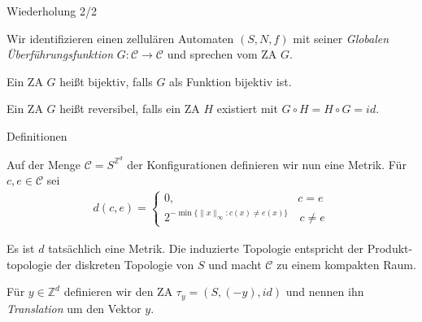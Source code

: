 \documentclass[aspectratio=169]{beamer}
\begin{document}
  \begin{frame}{Wiederholung 2/2}
    \begin{definition*}
      Wir identifizieren einen zellulären Automaten $(S,N,f)$ mit seiner \textit{Globalen Überführungsfunktion} $G: \mathcal{C} \to \mathcal{C}$ und sprechen vom ZA $G$.
    \end{definition*}

    \pause

    \begin{definition*}
      Ein ZA $G$ heißt bijektiv, falls $G$ als Funktion bijektiv ist.
    \end{definition*}

    \begin{definition*}
      Ein ZA $G$ heißt reversibel, falls ein ZA $H$ existiert mit $G \circ H = H \circ G = id$.
    \end{definition*}
  \end{frame}


  \begin{frame}{Definitionen}
    \begin{definition*}
      Auf der Menge $\mathcal{C} = S^{\mathbb{Z}^d}$ der Konfigurationen definieren wir nun eine Metrik. Für $c, e \in \mathcal{C}$ sei
      \begin{align*}
        d(c, e) = \begin{cases}
          0, & c = e \\
          2^{- \min \{ \|x\|_\infty: c(x) \neq e(x)\} }& \, c \neq e
        \end{cases}
      \end{align*}
    \end{definition*}

    \pause

    \begin{remark*}
      Es ist $d$ tatsächlich eine Metrik. Die induzierte Topologie entspricht der Produkt- topologie der diskreten Topologie von $S$ und macht $\mathcal{C}$ zu einem kompakten Raum.
    \end{remark*}

    \pause

    \begin{definition*}
      Für $y \in \mathbb{Z}^d$ definieren wir den ZA $\tau_{y} = (S, (-y), id)$ und nennen ihn \textit{Translation} um den Vektor $y$.
    \end{definition*}

  \end{frame}
\end{document}

